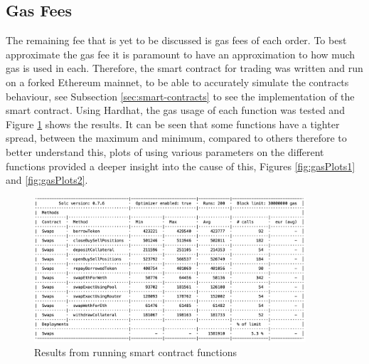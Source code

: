 \subsection{Gas Fees}
The remaining fee that is yet to be discussed is gas fees of each order. To best approximate the gas fee it is paramount to have an approximation to how much gas is used in each. Therefore, the smart contract for trading was written and run on a forked Ethereum mainnet, to be able to accurately simulate the contracts behaviour, see Subsection \ref{sec:smart-contracts} to see the implementation of the smart contract. Using Hardhat, the gas usage of each function was tested and Figure \ref{fig:gasResult} shows the results. It can be seen that some functions have a tighter spread, between the maximum and minimum, compared to others therefore to better understand this, plots of using various parameters on the different functions provided a deeper insight into the cause of this, Figures \ref{fig:gasPlots1} and \ref{fig:gasPlots2}.
\begin{figure}[!htb]
    \centering
    \includegraphics[width=0.9\textwidth]{project/Images/gas_fee_results.png}
    \caption{Results from running smart contract functions \label{fig:gasResult}}
\end{figure}

